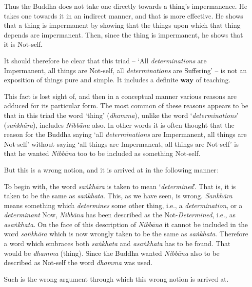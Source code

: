 Thus the Buddha does not take one directly towards a thing's impermanence. He takes one towards it in an indirect manner, and that is more effective. He shows that a thing is impermanent by showing that the things upon which that thing depends are impermanent. Then, since the thing is impermanent, he shows that it is Not-self.

It should therefore be clear that this triad -- `All \emph{determinations} are Impermanent, all things are Not-self, all \emph{determinations} are Suffering' -- is not an exposition of things pure and simple. It includes a definite \textbf{way} of teaching.

This fact is lost sight of, and then in a conceptual manner various reasons are adduced for its particular form. The most common of these reasons appears to be that in this triad the word `thing' (\emph{dhamma}), unlike the word `\emph{determinations}' (\emph{saṅkhāra}), includes \emph{Nibbāna} also. In other words it is often thought that the reason for the Buddha saying `all \emph{determinations} are Impermanent, all things are Not-self' without saying `all things are Impermanent, all things are Not-self' is that he wanted \emph{Nibbāna} too to be included as something Not-self.

But this is a wrong notion, and it is arrived at in the following manner:

To begin with, the word \emph{saṅkhāra} is taken to mean `\emph{determined}'. That is, it is taken to be the same as \emph{saṅkhata}. This, as we have seen, is wrong. \emph{Sankhāra} means something which \emph{determines} some other thing, i.e., a \emph{determination}, or a \emph{determinant} Now, \emph{Nibbāna} has been described as the Not-\emph{Determined}, i.e., as \emph{asaṅkhata}. On the face of this description of \emph{Nibbāna} it cannot be included in the word \emph{saṅkhāra} which is now wrongly taken to be the same as \emph{saṅkhata}. Therefore a word which embraces both \emph{saṅkhata} and \emph{asaṅkhata} has to be found. That would be \emph{dhamma} (thing). Since the Buddha wanted \emph{Nibbāna} also to be described as Not-self the word \emph{dhamma} was used.

Such is the wrong argument through which this wrong notion is arrived at.

